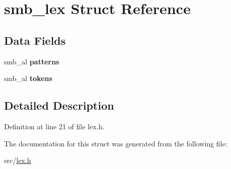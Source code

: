 \hypertarget{structsmb__lex}{\section{smb\-\_\-lex \-Struct \-Reference}
\label{structsmb__lex}
}
\subsection*{\-Data \-Fields}
\begin{DoxyCompactItemize}
\item 
\hypertarget{structsmb__lex_afe2a4887395d4c75e7672d1bee9e71de}{smb\-\_\-al {\bfseries patterns}}\label{structsmb__lex_afe2a4887395d4c75e7672d1bee9e71de}

\item 
\hypertarget{structsmb__lex_ac29456287cb28d1f74287003ddefa1f1}{smb\-\_\-al {\bfseries tokens}}\label{structsmb__lex_ac29456287cb28d1f74287003ddefa1f1}

\end{DoxyCompactItemize}


\subsection{\-Detailed \-Description}


\-Definition at line 21 of file lex.\-h.



\-The documentation for this struct was generated from the following file\-:\begin{DoxyCompactItemize}
\item 
src/\hyperlink{lex_8h}{lex.\-h}\end{DoxyCompactItemize}
